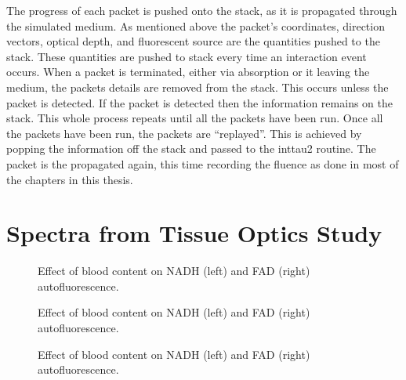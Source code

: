 \begin{appendices}
The progress of each packet is pushed onto the stack, as it is propagated through the simulated medium. 
As mentioned above the packet's coordinates, direction vectors, optical depth, and fluorescent source are the quantities pushed to the stack.
These quantities are pushed to stack every time an interaction event occurs.
When a packet is terminated, either via absorption or it leaving the medium, the packets details are removed from the stack.
This occurs unless the packet is detected.
If the packet is detected then the information remains on the stack.
This whole process repeats until all the packets have been run.
Once all the packets have been run, the packets are ``replayed''.
This is achieved by popping the information off the stack and passed to the inttau2 routine.
The packet is the propagated again, this time recording the fluence as done in most of the chapters in this thesis.


\chapter{Spectra from Tissue Optics Study}
\label{app:spectra}


\begin{figure}[!htbp]
    \centering
    \caption{Effect of blood content on NADH (left) and FAD (right) autofluorescence.}%
    \label{fig:260nadhfad-blood}%
\end{figure}

\begin{figure}[!htbp]
    \centering
    \caption{Effect of blood content on NADH (left) and FAD (right) autofluorescence.}%
    \label{fig:320nadhfad-blood}%
\end{figure}

\begin{figure}[!htbp]
    \centering
    \caption{Effect of blood content on NADH (left) and FAD (right) autofluorescence.}%
    \label{fig:365nadhfad-blood}%
\end{figure}


\end{appendices}

